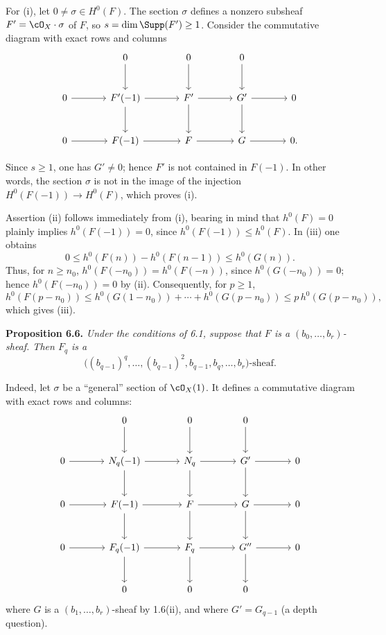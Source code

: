 For (i), let $0\ne\sigma\in H^0(F)$. The section $\sigma$ defines a nonzero subsheaf $F'=\cO_X\cdot\sigma$ of $F$, so $s=\dim\Supp(F')\geq1$. Consider the commutative diagram with exact rows and columns
\[
\begin{tikzcd}[column sep=large,row sep=large]
&0 \arrow[d]&0 \arrow[d]&0 \arrow[d]&\\
0 \arrow[r]&F'(-1) \arrow[r] \arrow[d]&F' \arrow[r] \arrow[d]&G' \arrow[r] \arrow[d]&0\\
0 \arrow[r]&F(-1) \arrow[r]&F \arrow[r]&G \arrow[r]&0.
\end{tikzcd}
\]

Since $s\geq1$, one has $G'\ne0$; hence $F'$ is not contained in $F(-1)$. In other words, the section $\sigma$ is not in the image of the injection $H^0(F(-1))\to H^0(F)$, which proves (i).

Assertion (ii) follows immediately from (i), bearing in mind that $h^0(F)=0$ plainly implies $h^0(F(-1))=0$, since $h^0(F(-1))\leq h^0(F)$. In (iii) one obtains
\[
  0\leq h^0(F(n))-h^0(F(n-1))\leq h^0(G(n)).
\]
Thus, for $n\geq n_0$, $h^0(F(-n_0))=h^0(F(-n))$, since $h^0(G(-n_0))=0$; hence $h^0(F(-n_0))=0$ by (ii). Consequently, for $p\geq1$,
\[
  h^0(F(p-n_0))
  \leq h^0(G(1-n_0))+\cdots+h^0(G(p-n_0))
  \leq p\,h^0(G(p-n_0)),
\]
which gives (iii).

\textbf{Proposition 6.6.} \emph{Under the conditions of 6.1, suppose that $F$ is a $(b_0,\ldots,b_r)$-sheaf. Then $F_q$ is a
\[
  \bigl((b_{q-1})^q,\ldots,(b_{q-1})^2,b_{q-1},b_q,\ldots,b_r\bigr)\text{-sheaf}.
\]}

Indeed, let $\sigma$ be a ``general'' section of $\cO_X(1)$. It defines a commutative diagram with exact rows and columns:
\[
\begin{tikzcd}[column sep=large,row sep=large]
&0 \arrow[d]&0 \arrow[d]&0 \arrow[d]&\\
0 \arrow[r]&N_q(-1) \arrow[r] \arrow[d]&N_q \arrow[r] \arrow[d]&G' \arrow[r] \arrow[d]&0\\
0 \arrow[r]&F(-1) \arrow[r] \arrow[d]&F \arrow[r] \arrow[d]&G \arrow[r] \arrow[d]&0\\
0 \arrow[r]&F_q(-1) \arrow[r] \arrow[d]&F_q \arrow[r] \arrow[d]&G'' \arrow[r] \arrow[d]&0\\
&0&0&0&
\end{tikzcd}
\]
where $G$ is a $(b_1,\ldots,b_r)$-sheaf by 1.6(ii), and where $G'=G_{q-1}$ (a depth question).

